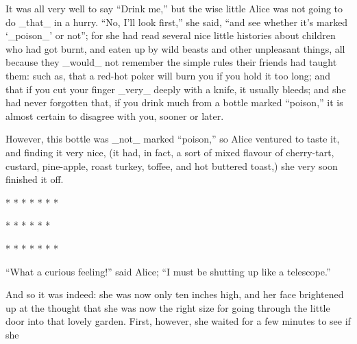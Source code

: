 \documentclass{book}
\begin{document}
It was all very well to say ``Drink me,'' but the wise little Alice was not going to do \_that\_ in a hurry. ``No, I’ll look first,'' she said, ``and see whether it’s marked ‘\_poison\_’ or not''; for she had read several nice little histories about children who had got burnt, and eaten up by wild beasts and other unpleasant things, all because they \_would\_ not remember the simple rules their friends had taught them: such as, that a red-hot poker will burn you if you hold it too long; and that if you cut your finger \_very\_ deeply with a knife, it usually bleeds; and she had never forgotten that, if you drink much from a bottle marked ``poison,'' it is almost certain to disagree with you, sooner or later.

However, this bottle was \_not\_ marked ``poison,'' so Alice ventured to taste it, and finding it very nice, (it had, in fact, a sort of mixed flavour of cherry-tart, custard, pine-apple, roast turkey, toffee, and hot buttered toast,) she very soon finished it off.

*      *      *      *      *      *      *

*      *      *      *      *      *

*      *      *      *      *      *      *

``What a curious feeling!'' said Alice; ``I must be shutting up like a telescope.''

And so it was indeed: she was now only ten inches high, and her face brightened up at the thought that she was now the right size for going through the little door into that lovely garden. First, however, she waited for a few minutes to see if she
\end{document}
